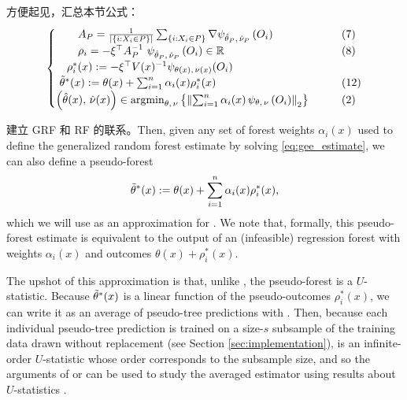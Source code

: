 \documentclass[aos]{imsart}
\theoremstyle{plain}
\theoremstyle{definition}
\theoremstyle{remark}
\begin{document}
\begin{CJK}{UTF8}{gbsn}
方便起见，汇总本节公式：
\begin{equation*}
\begin{cases}
\qquad A_P = \frac{1}{\abs{\cb{i : X_i \in P}}} \sum_{\cb{i : X_i \in P}} \nabla \psi_{\htheta_P, \, \hnu_P}\p{O_i} &\qquad (7) \\
\qquad  \rho_i = -\xi^\top A_P^{-1} \ \psi_{\htheta_P, \, \hnu_P}\p{O_i} \in \RR &\qquad (8)  \\
\quad \rho_i^*(x) :=  -\xi^\top V(x)^{-1} \psi_{\theta(x), \, \nu(x)}(O_i) & \\
\,\, \ttheta^*(x) := \theta(x) + \sum_{i = 1}^n \alpha_i(x) \rho_i^*(x) &\qquad (12) \\
\p{\htheta(x), \, \hnu(x)} \in \argmin_{\theta, \, \nu} \cb{\Norm{\sum_{i = 1}^n \alpha_i(x) \, \psi_{\theta, \, \nu}\p{O_i}}_2} &\qquad (2) \\

\end{cases}
\end{equation*}



建立 GRF 和 RF 的联系。Then, given any set of forest weights $\alpha_i(x)$ used to define the generalized random forest
estimate  by solving \eqref{eq:gee_estimate}, we can also define a
pseudo-forest
\begin{equation}
\label{eq:pseudo_forest}
\ttheta^*(x) := \theta(x) + \sum_{i = 1}^n \alpha_i(x) \rho_i^*(x),
\end{equation}
which we will use as an approximation for  . We note that,
formally, this pseudo-forest estimate  is equivalent to the output of an (infeasible)
regression forest with weights $\alpha_i(x)$ and outcomes $\theta(x) + \rho_i^*(x)$.

The upshot of this approximation is that, unlike , the pseudo-forest  is a $U$-statistic.
Because $\tilde{\theta}^*(x)$ is a linear function of the pseudo-outcomes $\rho_i^*(x)$, we can write it as an average of pseudo-tree predictions
 with
.
Then, because each individual pseudo-tree prediction  is trained on a size-$s$ subsample
of the training data drawn without replacement (see Section \ref{sec:implementation}), 
 is an infinite-order $U$-statistic whose order corresponds to the subsample size,
and so the arguments of \citet{mentch2016quantifying} or \citet{wager2015estimation} can be used to study the averaged estimator
 using results about $U$-statistics \citep{hoeffding1948class,efron1981jackknife}.



\end{CJK}
\end{document}
